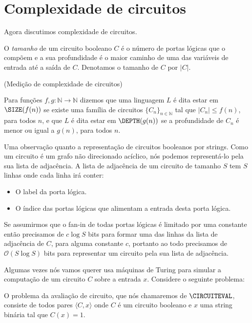 \section{Complexidade de circuitos} \label{complexidade_circuitos}

Agora discutimos complexidade de circuitos.

O \emph{tamanho} de um circuito booleano $C$ é o número de portas lógicas que o compõem e a sua profundidade é o maior caminho de uma das variáveis de entrada até a saída de $C$. Denotamos o tamanho de $C$ por $\lvert C \rvert$. 

\begin{defi}(Medição de complexidade de circuitos)

Para funções $f, g : \mathbb{N} \to \mathbb{N}$ dizemos que uma linguagem $L$ é dita estar em $\SIZE(f(n))$ se existe uma família de circuitos $\{C_{n}\}_{n \in \mathbb{N}}$ tal que $\lvert C_{n} \rvert \leq f(n)$, para todos $n$, e que $L$ é dita estar em $\DEPTH(g(n))$ se a profundidade de $C_{n}$ é menor ou igual a $g(n)$, para todos $n$.

\end{defi}

Uma observação quanto a representação de circuitos booleanos por strings. Como um circuito é um grafo não direcionado acíclico, nós podemos representá-lo pela sua lista de adjacência. A lista de adjacência de um circuito de tamanho $S$ tem $S$ linhas onde cada linha irá conter:

\begin{itemize}

\item O label da porta lógica.

\item O índice das portas lógicas que alimentam a entrada desta porta lógica.

\end{itemize}

Se assumirmos que o fan-in de todas portas lógicas é limitado por uma constante então precisamos de $c\log S$ bits para formar uma das linhas da lista de adjacência de $C$, para alguma constante $c$, portanto ao todo precisamos de $\mathcal{O}(S\log S)$ bits para representar um circuito pela sua lista de adjacência.

Algumas vezes nós vamos querer usa máquinas de Turing para simular a computação de um circuito $C$ sobre a entrada $x$. Considere o seguinte problema:

\begin{defi} 

O problema da avaliação de circuito, que nós chamaremos de $\CIRCUITEVAL$, consiste de todos pares $\langle C, x \rangle$ onde $C$ é um circuito booleano e $x$ uma string binária tal que $C(x) = 1$. 

\end{defi}

